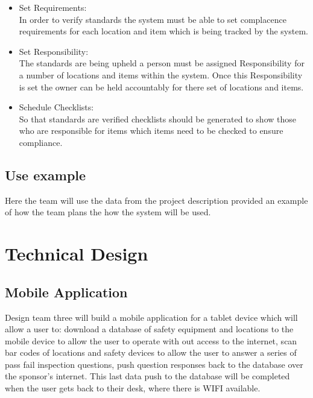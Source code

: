 \documentclass[Letter,11pt]{article}
\begin{document}
		\begin{itemize}
			\item Set Requirements:\\
			In order to verify standards the system must be able to set complacence requirements for each location and item which is being tracked by the system.
			\item Set Responsibility:\\
			The standards are being upheld a person must be assigned Responsibility for a number of locations and items within the system. Once this Responsibility is set the owner can be held accountably for there set of locations and items. 
			\item Schedule Checklists:\\
			So that standards are verified  checklists should be generated to show those who are responsible for items which items need to be checked to ensure compliance.
		\end{itemize}
		
	\subsection{Use example}
		Here the team will use the data from the project description provided an example of how the team plans the how the system will be used.
		  
		


\section{Technical Design}

	\subsection{Mobile Application}
	Design team three will build a mobile application for a tablet device which will allow a user to: download a database of safety equipment and locations to the mobile device to allow the user to operate with out access to the internet, scan bar codes of locations and safety devices to allow the user to answer a series of pass fail inspection questions, push question responses back to the database over the sponsor's internet. This last data push to the database will be completed when the user gets back to their desk, where there is WIFI available.
\end{document}
